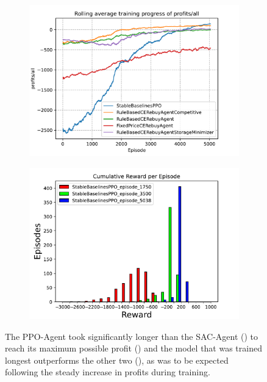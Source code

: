 \begin{figure}[ht]
	\centering
	\begin{subfigure}[t]{0.49\textwidth}
		\centering
		\includegraphics[width = \textwidth]{images/experiments/PPOOligopoly/PPOOligopolyLineProfitsAll.pdf}\\
		\label{fig:PPOOligopolyLineProfitsAll}
	\end{subfigure}
	\begin{subfigure}[t]{0.49\textwidth}
		\centering
		\includegraphics[width = \textwidth]{images/experiments/PPOOligopoly/PPOOligopolyCumulativeRewards.pdf}\\
		\label{fig:PPOOligopolyCumulativeRewards}
	\end{subfigure}
	\caption{The PPO-Agent took significantly longer than the SAC-Agent () to reach its maximum possible profit () and the model that was trained longest outperforms the other two (), as was to be expected following the steady increase in profits during training.}\label{fig:PPOOligopolyMixed}
\end{figure}

